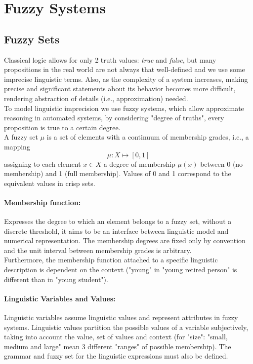 \section{Fuzzy Systems}

\subsection{Fuzzy Sets}

Classical logic allows for only 2 truth values: \textit{true} and \textit{false}, but  many propositions in the real world are not always that well-defined and we use some imprecise linguistic terms. Also, as the complexity of a system increases, making precise and significant statements about its behavior becomes more difficult, rendering abstraction of details (i.e., approximation) needed.\\

To model linguistic imprecision we use fuzzy systems, which allow approximate reasoning in automated systems, by considering "degree of truths", every proposition is true to a certain degree.\\

A fuzzy set $\mu$ is a set of elements with a continuum of membership grades, i.e., a mapping
$$ \mu: X \mapsto [0,1] $$
assigning to each element $x \in X$ a degree of membership $\mu(x)$ between 0 (no membership) and 1 (full membership). Values of 0 and 1 correspond to the equivalent values in crisp sets.\\

\paragraph{Membership function:} Expresses the degree to which an element belongs to a fuzzy set, without a discrete threshold, it aims to be an interface between linguistic model and numerical representation. The membership degrees are fixed only by convention and the unit interval between membership grades is arbitrary.\\
Furthermore, the membership function attached to a specific linguistic description is dependent on the context ("young" in "young retired person" is different than in "young student").\\

\paragraph{Linguistic Variables and Values:} Linguistic variables assume linguistic values and represent attributes in fuzzy systems. Linguistic values partition the possible values of  a variable subjectively, taking into account the value, set of values and context (for "size": "small, medium and large" mean 3 different "ranges" of possible membership). The grammar and fuzzy set for the linguistic expressions must also be defined.\\

